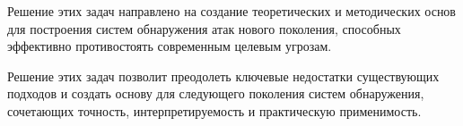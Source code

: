 Решение этих задач направлено на создание теоретических и методических основ для построения систем обнаружения атак нового поколения, способных эффективно противостоять современным целевым угрозам.

Решение этих задач позволит преодолеть ключевые недостатки существующих подходов и создать основу для следующего поколения систем обнаружения, сочетающих точность, интерпретируемость и практическую применимость.

